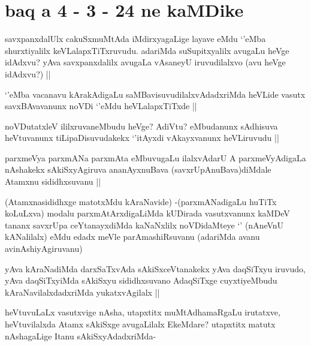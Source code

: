 \section*{baq a 4 - 3 - 24 ne kaMDike}

\begin{artha}
savxpanxdalUlx cakuSxmuMtAda iMdirxyagaLige layave eMdu `\stext'eMba shurxtiyalilx keVLalapxTiTxruvudu. adariMda suSupitxyalilx avugaLu heVge idAdxvu? yAva savxpanxdalilx avugaLa vAsaneyU iruvudilalxvo (avu heVge idAdxvu?) ||
\end{artha}

\begin{artha}
`\stext'eMba vacanavu kArakAdigaLu saMBavisuvudilalxvAdadxriMda heVLide vasutx savxBAvavanunx noVDi `\stext'eMdu heVLalapxTiTxde ||
\end{artha}

\begin{artha}
noVDutatxleV ililxruvaneMbudu heVge? AdiVtu? eMbudanunx sAdhisuva heVtuvanunx tiLipaDisuvudakekx `\stext'itAyxdi vAkayxvanunx heVLiruvudu ||
\end{artha}


\begin{artha}
parxmeVya parxmANa parxmAta eMbuvugaLu ilalxvAdarU A parxmeVyAdigaLa nAshakekx sAkiSxyAgiruva ananAyxnuBava (savxrUpAnuBava)diMdale Atamxnu sididhxsuvanu ||
\end{artha}

\begin{artha}
(Atamxnasididhxge matotxMdu kAraNavide) -(parxmANadigaLu huTiTx koLuLxva) modalu parxmAtArxdigaLiMda kUDirada vasutxvanunx kaMDeV tananx savxrUpa ceYtanayxdiMda kaNaNxlilx noVDidaMteye `\stext' (nAneVnU kANalilalx) eMdu edadx meVle parAmashiRsuvanu (adariMda avanu avinAshiyAgiruvanu)
\end{artha}


\begin{artha}
yAva kAraNadiMda darxSaTxvAda sAkiSxceVtanakekx yAva daqSiTxyu iruvudo, yAva daqSiTxyiMda sAkiSxyu sididhxsuvano AdaqSiTxge cuyxtiyeMbudu kAraNavilalxdadxriMda yukatxvAgilalx ||
\end{artha}


\begin{artha}
heVtuvuLaLx vasutxvige nAsha, utapxtitx muMtAdhamaRgaLu irutatxve, heVtuvilalxda Atamx sAkiSxge avugaLilalx EkeMdare? utapxtitx matutx nAshagaLige Itanu sAkiSxyAdadxriMda-
\end{artha}

